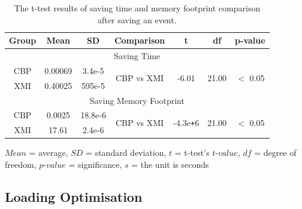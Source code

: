 \documentclass[sigplan,review,anonymous]{acmart}\settopmatter{printfolios=true,printccs=false,printacmref=false}
\begin{document}
\begin{table}[ht]
    \footnotesize
    \centering
    \caption{The t-test results of saving time and memory footprint comparison after saving an event.}
    \label{table:ttest_results_savetime}
    \begin{tabular}
        {| c c c | c c c c |}
        \hline 
        Group & Mean & SD & Comparison & t  & df & p-value \\  
        \hline 
        \multicolumn{7}{|c|}{Saving Time} \\
        \hline
        CBP & 0.00069    & 3.4e-5 & \multirow{2}{*}{CBP vs XMI} & \multirow{2}{*}{-6.01}   & \multirow{2}{*}{21.00} & \multirow{2}{*}{$<$ 0.05} \\
        XMI & 0.40025   & 595e-5 &  &   &   &  \\ 
        \hline
        \multicolumn{7}{|c|}{Saving Memory Footprint} \\
        \hline 
        CBP & 0.0025    & 18.8e-6 &  \multirow{2}{*}{CBP vs XMI} & \multirow{2}{*}{-4.3e\texttt{+}6} & \multirow{2}{*}{21.00} & \multirow{2}{*}{$<$ 0.05} \\
        XMI & 17.61   & 2.4e-6 &  &  &  &  \\ 
        \hline 
        \hline 
    \end{tabular}
$Mean$ = average, $SD$ = standard deviation, $t$ = t-test's $t$-$value$, $df$ = degree of freedom, $p$-$value$ = significance, $s$ = the unit is seconds
\end{table}

\subsection{Loading Optimisation}
\end{document}
